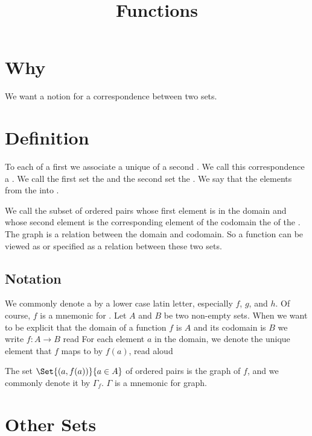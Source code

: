 







\title{Functions}

\section{Why}
We want a notion for a correspondence between two sets.

\section{Definition}

To each  of a first  we associate a unique  of a second .
We call this correspondence a .
We call the first set the  and the second set the .
We say that the   elements from the  into .

We call the subset of ordered pairs whose first element is in the domain and whose second element is the corresponding element of the codomain the  of the .
The graph is a relation between the domain and codomain.
So a function can be viewed as or specified as a relation between these two sets.

\subsection{Notation}
We commonly denote a  by a lower case latin letter, especially $f$, $g$, and $h$.
Of course, $f$ is a mnemonic for .
Let $A$ and $B$ be two non-empty sets.
When we want to be explicit that the domain of a function $f$ is $A$ and its codomain is $B$ we write $f: A \to B$ read 
For each element $a$ in the domain, we denote the unique element that $f$ maps to by $f(a)$, read aloud 

The set $\Set{(a, f(a))}{a \in A}$ of ordered pairs is the graph of $f$, and we commonly denote it by $\Gamma_f$.
$\Gamma$ is a mnemonic for graph.

\section{Other Sets}


